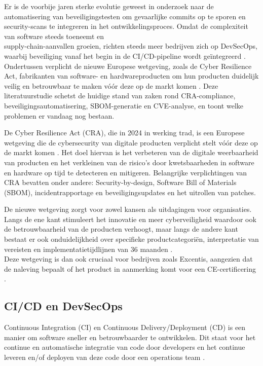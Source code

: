 Er is de voorbije jaren sterke evolutie geweest in onderzoek naar de automatisering van beveiligingstesten om gevaarlijke commits op te sporen en security-scans te integreren in het ontwikkelingsproces. Omdat de complexiteit van software steeds toeneemt en\\supply-chain-aanvallen groeien, richten steeds meer bedrijven zich op DevSecOps, waarbij beveiliging vanaf het begin in de CI/CD-pipeline wordt geïntegreerd \parencite{Takahashi2025}. Ondertussen verplicht de nieuwe Europese wetgeving, zoals de Cyber Resilience Act, fabrikanten van software- en hardwareproducten om hun producten duidelijk veilig en betrouwbaar te maken vóór deze op de markt komen \parencite{EU_CRA}. Deze literatuurstudie schetst de huidige stand van zaken rond CRA-compliance, beveiligingsautomatisering, SBOM-generatie en CVE-analyse, en toont welke problemen er vandaag nog bestaan.

De Cyber Resilience Act (CRA), die in 2024 in werking trad, is een Europese wetgeving die de cybersecurity van digitale producten verplicht stelt vóór deze op de markt komen \parencite{EU_CRA}. Het doel hiervan is het verbeteren van de digitale weerbaarheid van producten en het verkleinen van de risico’s door kwetsbaarheden in software en hardware op tijd te detecteren en mitigeren. Belangrijke verplichtingen van CRA bevatten onder andere: Security-by-design, Software Bill of Materials (SBOM), incidentrapportage en beveiligingsupdates en het uitrollen van patches.

De nieuwe wetgeving zorgt voor zowel kansen als uitdagingen voor organisaties. Langs de ene kant stimuleert het innovatie en meer cyberveiligheid waardoor ook de betrouwbaarheid van de producten verhoogt, maar langs de andere kant bestaat er ook onduidelijkheid over specifieke productcategoriën, interpretatie van vereisten en implementatietijdlijnen van 36 maanden \parencite{ECSO2024}.\\Deze wetgeving is dan ook cruciaal voor bedrijven zoals Excentis, aangezien dat de naleving bepaalt of het product in aanmerking komt voor een CE-certificering \parencite{EuropeanCommission2024CRAnews}.

\subsection{CI/CD en DevSecOps}

Continuous Integration (CI) en Continuous Delivery/Deployment (CD) is een manier om software sneller en betrouwbaarder te ontwikkelen. Dit staat voor het continue en automatische integratie van code door developers en het continue leveren en/of deployen van deze code door een operations team \parencite{RedHat2025}.

